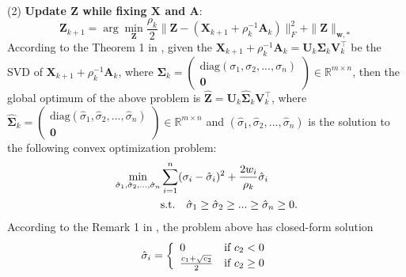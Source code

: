 \documentclass[10pt,twocolumn,letterpaper,sort&compress]{article}
\begin{document}
\\
(2) \textbf{Update $\mathbf{Z}$ while fixing $\mathbf{X}$ and $\mathbf{A}$}:
\vspace{-1mm}
\begin{equation}
\label{e14}
\mathbf{Z}_{k+1}
=
\arg\min_{\mathbf{Z}}\frac{\rho_{k}}{2}
\|\mathbf{Z} - (\mathbf{X}_{k+1}+\rho_{k}^{-1}\mathbf{A}_{k})\|_{F}^{2}
+
\|\mathbf{Z}\|_{\bm{w},*}
\end{equation}
According to the Theorem 1 in \cite{wnnmijcv}, given the $\mathbf{X}_{k+1}+\rho_{k}^{-1}\mathbf{A}_{k}=\mathbf{U}_{k}\mathbf{\Sigma}_{k}\mathbf{V}_{k}^{\top}$ be the SVD of $\mathbf{X}_{k+1}+\rho_{k}^{-1}\mathbf{A}_{k}$, where 
$\mathbf{\Sigma}_{k}=
\left( \begin{array}{c}
\text{diag}(\sigma_{1},\sigma_{2},...,\sigma_{n})
\\
\mathbf{0}
\end{array} \right)
\in\mathbb{R}^{m\times n}$,
then the global optimum of the above problem is 
$\hat{\mathbf{Z}}=\mathbf{U}_{k}\hat{\mathbf{\Sigma}}_{k}\mathbf{V}_{k}^{\top}$, where 
$\hat{\mathbf{\Sigma}}_{k}=
\left( \begin{array}{c}
\text{diag}(\hat{\sigma}_{1},\hat{\sigma}_{2},...,\hat{\sigma}_{n})
\\
\mathbf{0}
\end{array} \right)
\in\mathbb{R}^{m\times n}$
and $(\hat{\sigma}_{1},\hat{\sigma}_{2},...,\hat{\sigma}_{n})$ is the solution to the following convex optimization problem:
\vspace{-1mm}
\begin{equation}
\label{e15}
\vspace{-1mm}
\begin{split}
\min_{\hat{\sigma}_{1},\hat{\sigma}_{2},...,\hat{\sigma}_{n}}
&
\sum_{i=1}^{n}
(\sigma_{i}-\hat{\sigma}_{i})^{2}
+
\frac{2w_{i}}{\rho_{k}}\hat{\sigma}_{i}
\\
&
\text{s.t.}
\quad
\hat{\sigma}_{1}\ge \hat{\sigma}_{2} \ge...\ge \hat{\sigma}_{n}\ge 0.
\end{split}
\end{equation}
According to the Remark 1 in \cite{wnnmijcv}, the problem above has closed-form solution
\vspace{-1mm}
\begin{equation}
\label{e16}
\vspace{-1mm}
\hat{\sigma}_{i}
=
\left\{ \begin{array}{ll}
0 & \textrm{if $c_{2}<0$}\\
\frac{c_{1}+\sqrt{c_{2}}}{2} & \textrm{if $c_{2}\ge 0$}
\end{array} \right.
\end{equation}
\end{document}

